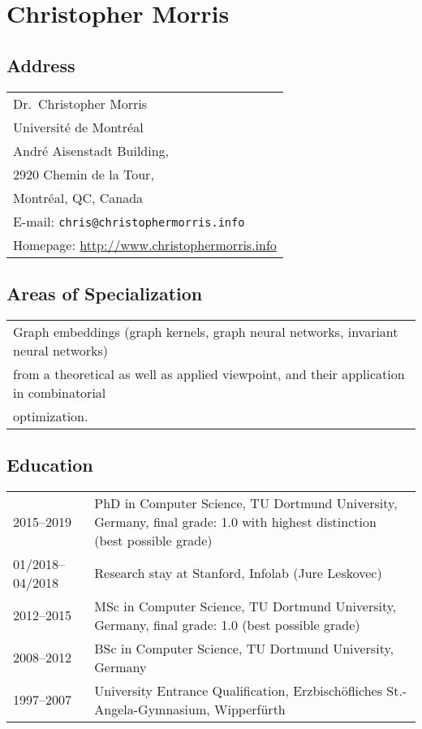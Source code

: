 \documentclass[11pt, a4paper]{scrartcl}
\begin{document}
\section*{\textcolor{upmaroon}{Christopher Morris}}
\vspace{-20pt}
\hrulefill
\subsection*{Address}
\noindent
\begin{tabular}{l}
Dr.~Christopher Morris\\
Université de Montréal\\ 
André Aisenstadt Building,\\ 
2920 Chemin de la Tour,\\
Montréal, QC, Canada\\
E-mail: \texttt{chris@christophermorris.info} \\
Homepage: \url{http://www.christophermorris.info} \\
\end{tabular}

\subsection*{Areas of Specialization}
\noindent
\begin{tabular}{l}
Graph embeddings (graph kernels, graph neural networks, invariant neural networks) \\from a theoretical as well as applied viewpoint, and their application in combinatorial\\ optimization. \\
\end{tabular}

\subsection*{Education}
\noindent
\begin{tabular}{p{2.8cm}p{12.0cm}}
	2015--2019&PhD in Computer Science, TU Dortmund University, Germany, final grade: 1.0 with highest distinction  (best possible grade)\\
	01/2018--04/2018& Research stay at Stanford, Infolab (Jure Leskovec)\\
	2012--2015&MSc in Computer Science, TU Dortmund University, Germany, final grade: 1.0 (best possible grade)\\
	2008--2012&BSc in Computer Science, TU Dortmund University, Germany\\
	1997--2007&University Entrance Qualification, Erzbisch\"ofliches St.-Angela-Gymnasium, Wipperf\"urth\\
\end{tabular}
\end{document}
